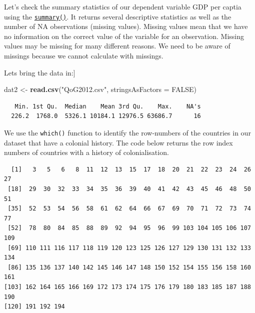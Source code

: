 \documentclass[]{article}
\newenvironment{Shaded}{\begin{snugshade}}{\end{snugshade}}
\newcommand{\DataTypeTok}[1]{\textcolor[rgb]{0.13,0.29,0.53}{#1}}
\newcommand{\DecValTok}[1]{\textcolor[rgb]{0.00,0.00,0.81}{#1}}
\newcommand{\KeywordTok}[1]{\textcolor[rgb]{0.13,0.29,0.53}{\textbf{#1}}}
\newcommand{\NormalTok}[1]{#1}
\newcommand{\OperatorTok}[1]{\textcolor[rgb]{0.81,0.36,0.00}{\textbf{#1}}}
\newcommand{\OtherTok}[1]{\textcolor[rgb]{0.56,0.35,0.01}{#1}}
\newcommand{\StringTok}[1]{\textcolor[rgb]{0.31,0.60,0.02}{#1}}
\begin{document}
Let's check the summary statistics of our dependent variable GDP per captia using the \href{https://www.rdocumentation.org/packages/base/versions/3.4.1/topics/summary}{\texttt{summary()}}. It returns several descriptive statistics as well as the number of NA observations (missing values). Missing values mean that we have no information on the correct value of the variable for an observation. Missing values may be missing for many different reasons. We need to be aware of missings because we cannot calculate with missings.

Lets bring the data in:{]}

\begin{Shaded}
\begin{Highlighting}[]
\NormalTok{dat2 <-}\StringTok{ }\KeywordTok{read.csv}\NormalTok{(}\StringTok{"QoG2012.csv"}\NormalTok{, }\DataTypeTok{stringsAsFactors =} \OtherTok{FALSE}\NormalTok{)}
\end{Highlighting}
\end{Shaded}

\begin{Shaded}
\end{Shaded}

\begin{verbatim}
   Min. 1st Qu.  Median    Mean 3rd Qu.    Max.    NA's 
  226.2  1768.0  5326.1 10184.1 12976.5 63686.7      16 
\end{verbatim}

We use the \texttt{which()} function to identify the row-numbers of the countries in our dataset that have a colonial history. The code below returns the row index numbers of countries with a history of colonialisation.

\begin{Shaded}
\end{Shaded}

\begin{verbatim}
  [1]   3   5   6   8  11  12  13  15  17  18  20  21  22  23  24  26  27
 [18]  29  30  32  33  34  35  36  39  40  41  42  43  45  46  48  50  51
 [35]  52  53  54  56  58  61  62  64  66  67  69  70  71  72  73  74  77
 [52]  78  80  84  85  88  89  92  94  95  96  99 103 104 105 106 107 109
 [69] 110 111 116 117 118 119 120 123 125 126 127 129 130 131 132 133 134
 [86] 135 136 137 140 142 145 146 147 148 150 152 154 155 156 158 160 161
[103] 162 164 165 166 169 172 173 174 175 176 179 180 183 185 187 188 190
[120] 191 192 194
\end{verbatim}
\end{document}
